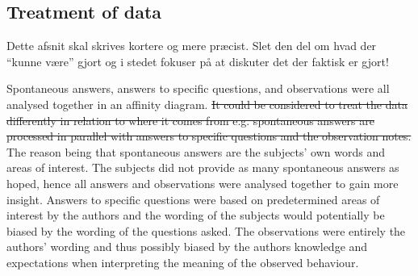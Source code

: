 \subsection{Treatment of data}
{\color{red} Dette afsnit skal skrives kortere og mere præcist. Slet den del om hvad der ``kunne være'' gjort og i stedet fokuser på at diskuter det der faktisk er gjort!}

Spontaneous answers, answers to specific questions, and observations were all analysed together in an affinity diagram. \sout{It could be considered to treat the data differently in relation to where it comes from e.g. spontaneous answers are processed in parallel with answers to specific questions and the observation notes.} The reason being that spontaneous answers are the subjects' own words and areas of interest. The subjects did not provide as many spontaneous answers as hoped, hence all answers and observations were analysed together to gain more insight. Answers to specific questions were based on predetermined areas of interest by the authors and the wording of the subjects would potentially be biased by the wording of the questions asked. The observations were entirely the authors' wording and thus possibly biased by the authors knowledge and expectations when interpreting the meaning of the observed behaviour.